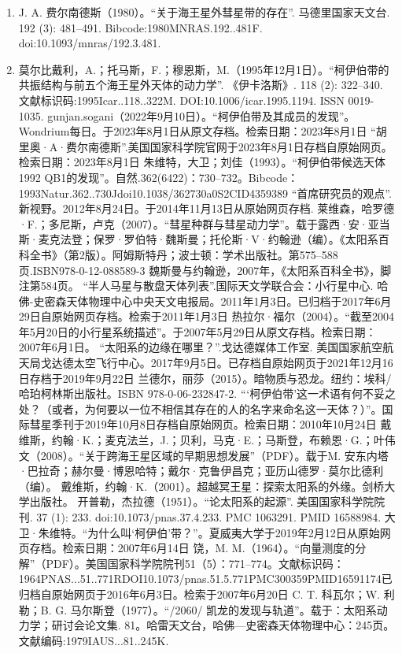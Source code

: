 \begin{enumerate}
\item J. A. 费尔南德斯（1980）。“关于海王星外彗星带的存在”. 马德里国家天文台. 192 (3): 481–491. Bibcode:1980MNRAS.192..481F. doi:10.1093/mnras/192.3.481.
\item 莫尔比戴利，A.；托马斯，F.；穆恩斯，M.（1995年12月1日）。“柯伊伯带的共振结构与前五个海王星外天体的动力学”. 《伊卡洛斯》. 118 (2): 322–340. 文献标识码:1995Icar..118..322M. DOI:10.1006/icar.1995.1194. ISSN 0019-1035.
 gunjan.sogani（2022年9月10日）。“柯伊伯带及其成员的发现”。Wondrium每日。于2023年8月1日从原文存档。检索日期：2023年8月1日
 “胡里奥·A·费尔南德斯”.美国国家科学院官网于2023年8月1日存档自原始网页。检索日期：2023年8月1日
 朱维特，大卫；刘佳（1993）。“柯伊伯带候选天体1992 QB1的发现”。自然.362(6422)：730–732。Bibcode：1993Natur.362..730Jdoi10.1038/362730a0S2CID4359389
 “首席研究员的观点”.新视野。2012年8月24日。于2014年11月13日从原始网页存档.
 莱维森，哈罗德·F.；多尼斯，卢克（2007）。“彗星种群与彗星动力学”。载于露西·安·亚当斯·麦克法登；保罗·罗伯特·魏斯曼；托伦斯·V·约翰逊（编）。《太阳系百科全书》（第2版）。阿姆斯特丹；波士顿：学术出版社。第575–588页.ISBN978-0-12-088589-3
 魏斯曼与约翰逊，2007年，《太阳系百科全书》，脚注第584页。
 “半人马星与散盘天体列表”.国际天文学联合会：小行星中心. 哈佛-史密森天体物理中心中央天文电报局。2011年1月3日。已归档于2017年6月29日自原始网页存档。检索于2011年1月3日
 热拉尔·福尔（2004）。“截至2004年5月20日的小行星系统描述”。于2007年5月29日从原文存档。检索日期：2007年6月1日。
 “太阳系的边缘在哪里？”.戈达德媒体工作室. 美国国家航空航天局戈达德太空飞行中心。2017年9月5日。已存档自原始网页于2021年12月16日存档于2019年9月22日
 兰德尔，丽莎（2015）。暗物质与恐龙。纽约：埃科/哈珀柯林斯出版社。ISBN 978-0-06-232847-2.
 “‘柯伊伯带’这一术语有何不妥之处？（或者，为何要以一位不相信其存在的人的名字来命名这一天体？）”。国际彗星季刊于2019年10月8日存档自原始网页。检索日期：2010年10月24日
 戴维斯，约翰·K.；麦克法兰，J.；贝利，马克·E.；马斯登，布赖恩·G.；叶伟文（2008）。“关于跨海王星区域的早期思想发展”（PDF）。载于M. 安东内塔·巴拉奇；赫尔曼·博恩哈特；戴尔·克鲁伊昌克；亚历山德罗·莫尔比德利（编）。
 戴维斯，约翰·K.（2001）。超越冥王星：探索太阳系的外缘。剑桥大学出版社。
 开普勒，杰拉德（1951）。“论太阳系的起源”. 美国国家科学院院刊. 37 (1): 233. doi:10.1073/pnas.37.4.233. PMC 1063291. PMID 16588984.
 大卫·朱维特。“为什么叫‘柯伊伯’带？”。夏威夷大学于2019年2月12日从原始网页存档。检索日期：2007年6月14日
 饶，M. M.（1964）。“向量测度的分解”（PDF）。美国国家科学院院刊51（5）：771–774。文献标识码：1964PNAS...51..771RDOI10.1073/pnas.51.5.771PMC300359PMID16591174已归档自原始网页于2016年6月3日。检索于2007年6月20日
 C. T. 科瓦尔；W. 利勒；B. G. 马尔斯登（1977）。“/2060/ 凯龙的发现与轨道”。载于：太阳系动力学；研讨会论文集. 81。哈雷天文台，哈佛—史密森天体物理中心：245页。文献编码:1979IAUS...81..245K.

\end{enumerate}
